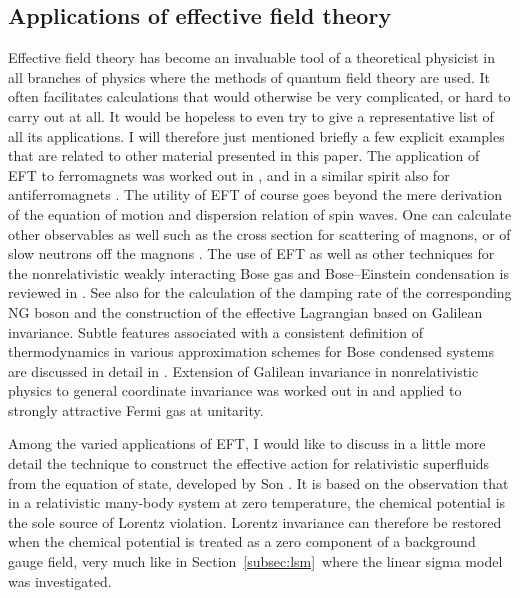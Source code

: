 \documentclass[final,2p,times,12pt,sort&compress]{elsarticle}
\begin{document}
\subsection{Applications of effective field theory}
Effective field theory has become an invaluable tool of a theoretical physicist
in all branches of physics where the methods of quantum field theory are used.
It often facilitates calculations that would otherwise be very complicated, or
hard to carry out at all. It would be hopeless to even try to give a
representative list of all its applications. I will therefore just mentioned
briefly a few explicit examples that are related to other material presented
in this paper. The application of EFT to ferromagnets was worked out in
\cite{Leutwyler:1993gf,Roman:1999ro,Hofmann:1998pp,Hofmann:2001ck}, and
in a similar spirit also for antiferromagnets
\cite{Hofmann:1997qm,Kampfer:2005ba,Brugger:2006dz,Hofmann:2009ru}. The utility
of EFT of course goes beyond the mere derivation of the equation of motion and
dispersion relation of spin waves. One can calculate other observables as well
such as the cross section for scattering of magnons, or of slow neutrons off the
magnons \cite{Burgess:1998ku}. The use of EFT as well as other techniques for
the nonrelativistic weakly interacting Bose gas and Bose--Einstein condensation
is reviewed in \cite{Andersen:2003qj}. See also \cite{Andersen:2002nd} for the
calculation of the damping rate of the corresponding NG boson and the
construction of the effective Lagrangian based on Galilean invariance. Subtle
features associated with a consistent definition of thermodynamics in various
approximation schemes for Bose condensed systems are discussed in detail in
\cite{Yukalov:2008yu}. Extension of Galilean invariance in nonrelativistic
physics to general coordinate invariance was worked out in \cite{Son:2005rv}
and applied to strongly attractive Fermi gas at unitarity.

Among the varied applications of EFT, I would like to discuss in a little
more detail the technique to construct the effective action for relativistic
superfluids from the equation of state, developed by Son \cite{Son:2002zn}. It
is based on the observation that in a relativistic many-body system at zero
temperature, the chemical potential is the sole source of Lorentz violation.
Lorentz invariance can therefore be restored when the chemical potential is
treated as a zero component of a background gauge field, very much like in
Section~\ref{subsec:lsm}\ where the linear sigma model was investigated.
\end{document}

